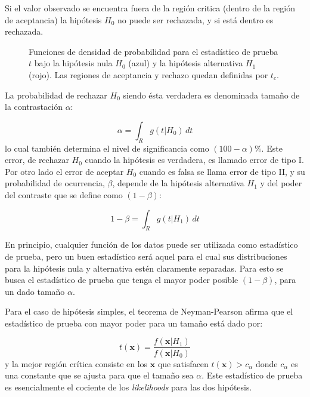 Si el valor observado se encuentra fuera de la región critica (dentro de la
región de aceptancia) la hipótesis $H_0$ no puede ser rechazada, y si está
dentro es rechazada.

\begin{figure}[h]
  \centering
  
  \caption{Funciones de densidad de probabilidad para el estadístico de prueba
    $t$ bajo la hipótesis nula $H_0$ (azul) y la hipótesis alternativa $H_1$
    (rojo). Las regiones de aceptancia y rechazo quedan definidas por $t_c$.}
  \label{fig:stat_test}
\end{figure}

La probabilidad de rechazar $H_0$ siendo ésta verdadera es denominada tamaño de la
contrastación $\alpha$:

\begin{equation}
  \alpha = \int_{R} g(t|H_0)\, dt
\end{equation}
%
lo cual también determina el nivel de significancia como
$(100 - \alpha) \%$. Este error, de rechazar $H_0$ cuando la hipótesis es verdadera, es llamado
error de tipo I. Por otro lado el error de aceptar $H_0$ cuando es falsa se
llama error de tipo II, y su probabilidad de ocurrencia, $\beta$, depende de la
hipótesis alternativa $H_1$ y del poder del contraste que se define como $(1-\beta)$:

\begin{equation}
1-\beta = \int_R g(t|H_1)\, dt
\end{equation}

En principio, cualquier función de los datos puede ser utilizada como estadístico
de prueba, pero un buen estadístico será aquel para el cual sus distribuciones
para la hipótesis nula y alternativa estén claramente separadas. Para esto se
busca el estadístico de prueba que tenga el mayor poder posible $(1-\beta)$, para un dado
tama\~no $\alpha$.

Para el caso de hipótesis simples, el teorema de Neyman-Pearson\cite{Neyman289} afirma que el
estadístico de prueba con mayor poder para un tama\~no está dado por:

\begin{equation}
  t(\bm{x}) = \frac{f(\bm{x}|H_1)}{f(\bm{x}|H_0)}
\end{equation}
%
y la mejor región crítica consiste en los $\bm{x}$ que satisfacen $t(\bm{x}) > c_\alpha$
donde $c_\alpha$ es una constante que se ajusta para que el tama\~no sea $\alpha$.
Este estadístico de prueba es esencialmente el cociente de los \emph{likelihoods}
para las dos hipótesis.


